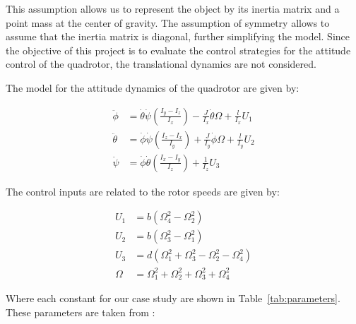 \documentclass[12pt]{article}
\begin{document}
This assumption allows us to represent the object by its inertia matrix and a point mass at the center of gravity. The assumption of symmetry allows to assume that the inertia matrix is diagonal, further simplifying the model. Since the objective of this project is to evaluate the control strategies for the attitude control of the quadrotor, the translational dynamics are not considered. 

The model for the attitude dynamics of the quadrotor are given by:

\begin{equation}
  \label{eq:dynamics}
  \begin{split}
    \ddot{\phi} &= \dot{\theta} \dot{\psi} \left ( \frac{I_y-I_z}{I_x} \right ) - \frac{J}{I_x} \dot{\theta} \Omega + \frac{l}{I_x} U_1 \\
    \ddot{\theta} &= \dot{\phi} \dot{\psi} \left ( \frac{I_z-I_x}{I_y} \right ) + \frac{J}{I_y} \dot{\phi} \Omega + \frac{l}{I_y} U_2 \\
    \ddot{\psi} &= \dot{\phi} \dot{\theta} \left ( \frac{I_x-I_y}{I_z} \right ) + \frac{1}{I_z} U_3
  \end{split}
\end{equation}

The control inputs are related to the rotor speeds are given by:

\begin{equation}
  \label{eq:inputs}
  \begin{split}
  U_1 &= b \left (\Omega^2_4 - \Omega^2_2 \right ) \\
  U_2 &= b \left (\Omega^2_3 - \Omega^2_1 \right ) \\
  U_3 &= d \left (\Omega^2_1 + \Omega^2_3 - \Omega^2_2 - \Omega^2_4 \right ) \\
  \Omega &= \Omega^2_1 + \Omega^2_2 + \Omega^2_3 + \Omega^2_4
  \end{split}
\end{equation}

Where each constant for our case study are shown in Table~\ref{tab:parameters}. These parameters are taken from \cite{Merh14}:
\end{document}
